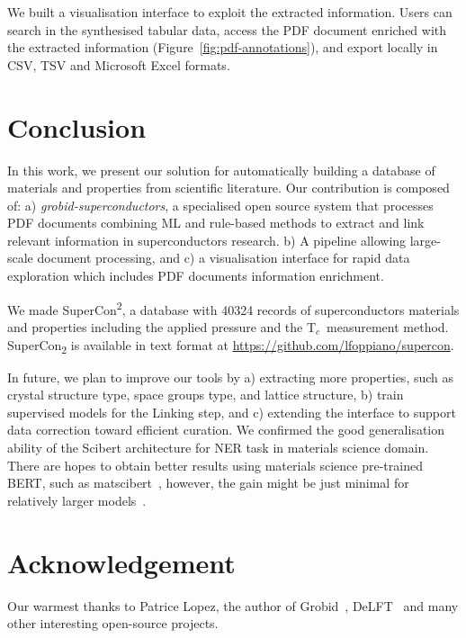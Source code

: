 \documentclass[]{interact}
\theoremstyle{plain}%
\theoremstyle{definition}
\theoremstyle{remark}
\newcommand{\tc}{T$_{c}$}
\begin{document}
We built a visualisation interface to exploit the extracted information.
Users can search in the synthesised tabular data, access the PDF document enriched with the extracted information (Figure~\ref{fig:pdf-annotations}), and export locally in CSV, TSV and Microsoft Excel formats.

\section{Conclusion}
\label{sec:conclusion}
In this work, we present our solution for automatically building a database of materials and properties from scientific literature.
Our contribution is composed of: a) \textit{grobid-superconductors}, a specialised open source system that processes PDF documents combining ML and rule-based methods to extract and link relevant information in superconductors research.
b) A pipeline allowing large-scale document processing, and c) a visualisation interface for rapid data exploration which includes PDF documents information enrichment.

We made SuperCon\textsuperscript{2}, a database with 40324 records of superconductors materials and properties including the applied pressure and the \tc~measurement method.
SuperCon\textsubscript{2} is available in text format at \url{https://github.com/lfoppiano/supercon}.

In future, we plan to improve our tools by a) extracting more properties, such as crystal structure type, space groups type, and lattice structure, b) train supervised models for the Linking step, and c) extending the interface to support data correction toward efficient curation.
We confirmed the good generalisation ability of the Scibert architecture for NER task in materials science domain.
There are hopes to obtain better results using materials science pre-trained BERT, such as matscibert~\cite{gupta_matscibert_2022}, however, the gain might be just minimal for relatively larger models~\cite{hong2022ScholarBERT}.

\section*{Acknowledgement}
\label{sec:acknowledgement}
Our warmest thanks to Patrice Lopez, the author of Grobid~\cite{GROBID}, DeLFT~\citep{DeLFT} and many other interesting open-source projects.
\end{document}
